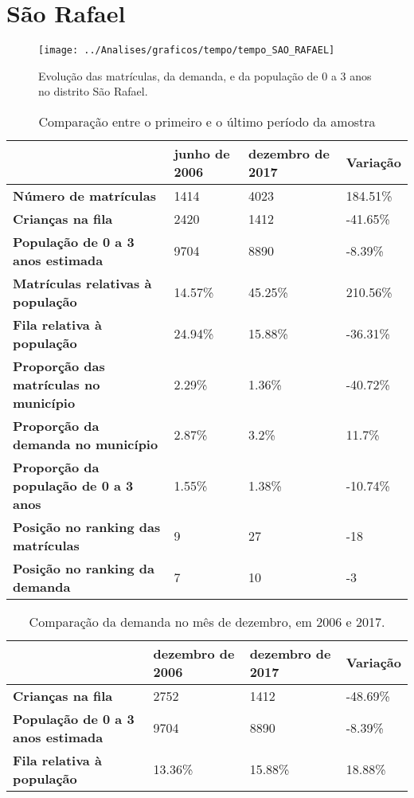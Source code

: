 \section{São Rafael}
\begin{figure}[H]
\centering
\texttt{[image: ../Analises/graficos/tempo/tempo\_SAO\_RAFAEL]}
\caption{Evolução das matrículas, da demanda, e da população de 0 a 3 anos no distrito São Rafael.}
\end{figure}
\begin{table}[H]
\begin{tabular}{|l|l|l|l|}
\hline
\textbf{}                                      & \textbf{junho de 2006}       & \textbf{dezembro de 2017}    & \textbf{Variação} \\ \hline
\textbf{Número de matrículas}                  & 1414 & 4023 & 184.51\% \\ \hline
\textbf{Crianças na fila}                      & 2420 & 1412 & -41.65\% \\ \hline
\textbf{População de 0 a 3 anos estimada}      & 9704 & 8890 & -8.39\% \\ \hline
\textbf{Matrículas relativas à população}      & 14.57\% & 45.25\% & 210.56\% \\ \hline
\textbf{Fila relativa à população}             & 24.94\% & 15.88\% & -36.31\% \\ \hline
\textbf{Proporção das matrículas no município} & 2.29\% & 1.36\% & -40.72\% \\ \hline
\textbf{Proporção da demanda no município}     & 2.87\% & 3.2\% & 11.7\% \\ \hline
\textbf{Proporção da população de 0 a 3 anos}  & 1.55\% & 1.38\% & -10.74\% \\ \hline
\textbf{Posição no ranking das matrículas}     & 9 & 27 & -18 \\ \hline
\textbf{Posição no ranking da demanda}         & 7 & 10 & -3 \\ \hline
\end{tabular}
\caption{Comparação entre o primeiro e o último período da amostra}
\end{table}
\begin{table}[H]
\begin{tabular}{|l|l|l|l|}
\hline
\textbf{}                                 & \textbf{dezembro de 2006} & \textbf{dezembro de 2017} & \textbf{Variação} \\ \hline
\textbf{Crianças na fila}                      & 2752 & 1412 & -48.69\% \\ \hline
\textbf{População de 0 a 3 anos estimada}      & 9704 & 8890 & -8.39\% \\ \hline
\textbf{Fila relativa à população}             & 13.36\% & 15.88\% & 18.88\% \\ \hline
\end{tabular}
\caption{Comparação da demanda no mês de dezembro, em 2006 e 2017.}
\end{table}
